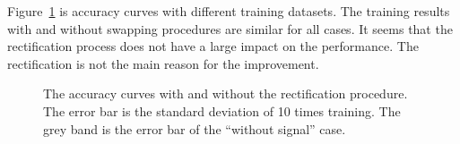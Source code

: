 \documentclass[12pt]{article}
\begin{document}
		Figure~\ref{fig:acc_curve_w_wo_swap_label} is accuracy curves with different training datasets. The training results with and without swapping procedures are similar for all cases. It seems that the rectification process does not have a large impact on the performance. The rectification is not the main reason for the improvement.
		\begin{figure}[htpb]
			\centering
			\caption{The accuracy curves with and without the rectification procedure. The error bar is the standard deviation of 10 times training. The grey band is the error bar of the ``without signal'' case.}
			\label{fig:acc_curve_w_wo_swap_label}
		\end{figure}
\end{document}
